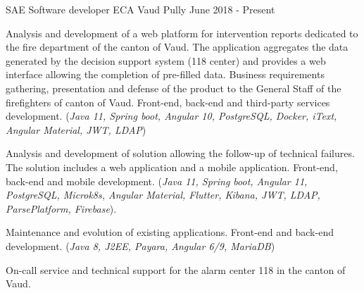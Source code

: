 


\begin{cventries}


\cventry
{SAE Software developer} %
{ECA Vaud} %
{Pully} %
{June 2018 - Present} %
{ %
\begin{cvitems}
\item {Analysis and development of a web platform for intervention reports dedicated to the fire department of the canton of Vaud.
The application aggregates the data generated by the decision support system (118 center) and provides a web interface allowing the completion of pre-filled data.
Business requirements gathering, presentation and defense of the product to the General Staff of the firefighters of canton of Vaud. Front-end, back-end and third-party services development.
(\emph{Java 11, Spring boot, Angular 10, PostgreSQL, Docker, iText, Angular Material, JWT, LDAP})}
\item {Analysis and development of solution allowing the follow-up of technical failures. The solution includes a web application and a mobile application. Front-end, back-end and mobile development.  (\emph{Java 11, Spring boot, Angular 11, PostgreSQL, Microk8s, Angular Material, Flutter, Kibana, JWT, LDAP, ParsePlatform, Firebase}).}
\item {Maintenance and evolution of existing applications. Front-end and back-end development.  (\emph{Java 8, J2EE, Payara, Angular 6/9, MariaDB})}
\item {On-call service and technical support for the alarm center 118 in the canton of Vaud.}
\end{cvitems}
}



\end{cventries}
